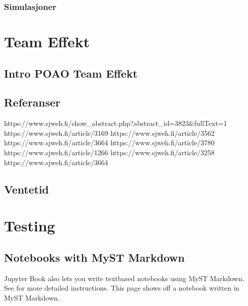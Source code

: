 \documentclass[letterpaper,10pt,english]{jupyterBook}
\begin{document}
\section{Simulasjoner}
\label{\detokenize{src/dsforum/fake_synth/simulations:simulasjoner}}\label{\detokenize{src/dsforum/fake_synth/simulations::doc}}
\sphinxstepscope


\part{Team Effekt}

\sphinxstepscope


\chapter{Intro POAO \sphinxhyphen{} Team Effekt}
\label{\detokenize{src/effect/intro:intro-poao-team-effekt}}\label{\detokenize{src/effect/intro::doc}}

\chapter{Referanser}
\label{\detokenize{src/effect/intro:referanser}}
\sphinxAtStartPar
https://www.sjweh.fi/show\_abstract.php?abstract\_id=3823\&fullText=1
https://www.sjweh.fi/article/3169
https://www.sjweh.fi/article/3562
https://www.sjweh.fi/article/3664
https://www.sjweh.fi/article/3780
https://www.sjweh.fi/article/1266
https://www.sjweh.fi/article/3258
https://www.sjweh.fi/article/3664

\sphinxstepscope


\chapter{Ventetid}
\label{\detokenize{src/effect/ventetid:ventetid}}\label{\detokenize{src/effect/ventetid::doc}}
\sphinxstepscope


\part{Testing}

\sphinxstepscope


\chapter{Notebooks with MyST Markdown}
\label{\detokenize{src/test/markdown-notebooks:notebooks-with-myst-markdown}}\label{\detokenize{src/test/markdown-notebooks::doc}}
\sphinxAtStartPar
Jupyter Book also lets you write text\sphinxhyphen{}based notebooks using MyST Markdown.
See  for more detailed instructions.
This page shows off a notebook written in MyST Markdown.
\end{document}
